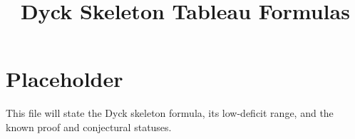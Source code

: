 \documentclass{article}
\title{Dyck Skeleton Tableau Formulas}
\author{}
\date{}
\begin{document}
\maketitle

\section{Placeholder}

This file will state the Dyck skeleton formula, its low-deficit range, and the
known proof and conjectural statuses.
\end{document}

